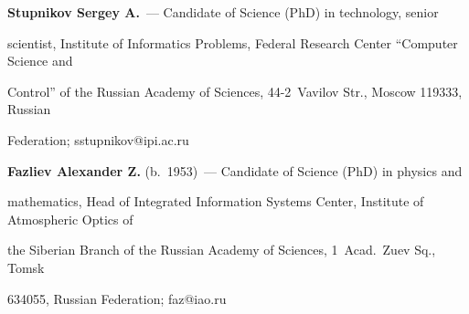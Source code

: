 \noindent


       \textbf{Stupnikov Sergey A.}~--- Candidate of Science (PhD) in technology, senior 


scientist, Institute of Informatics Problems, Federal Research Center ``Computer Science and 


Control'' of the Russian Academy of Sciences, 44-2~Vavilov Str., Moscow 119333, Russian 


Federation; sstupnikov@ipi.ac.ru


       


\vspace*{3pt}





\noindent


       \textbf{Fazliev Alexander Z.} (b.\ 1953)~--- Candidate of Science (PhD) in physics and 


mathematics, Head of Integrated Information Systems Center, Institute of Atmospheric Optics of 


the Siberian Branch of the Russian Academy of Sciences, 1~Acad.\ Zuev Sq., Tomsk


634055, Russian Federation; faz@iao.ru





  


\label{end\stat}








\renewcommand{\bibname}{\protect\rm Литература}


 





 





 


